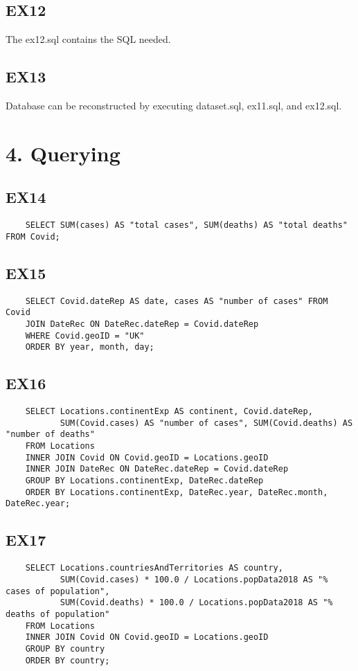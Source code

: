 \documentclass{report}
\begin{document}
\subsection*{EX12} 
The ex12.sql contains the SQL needed.
\subsection*{EX13} Database can be reconstructed by executing dataset.sql, ex11.sql, and ex12.sql.

\vspace{2mm}

\section*{4. Querying}
\subsection*{EX14}
\begin{verbatim}
    SELECT SUM(cases) AS "total cases", SUM(deaths) AS "total deaths" FROM Covid;
\end{verbatim}

\subsection*{EX15}
\begin{verbatim}
    SELECT Covid.dateRep AS date, cases AS "number of cases" FROM Covid
    JOIN DateRec ON DateRec.dateRep = Covid.dateRep
    WHERE Covid.geoID = "UK"
    ORDER BY year, month, day;
\end{verbatim}

\subsection*{EX16}
\begin {verbatim}
    SELECT Locations.continentExp AS continent, Covid.dateRep, 
           SUM(Covid.cases) AS "number of cases", SUM(Covid.deaths) AS "number of deaths"
    FROM Locations
    INNER JOIN Covid ON Covid.geoID = Locations.geoID
    INNER JOIN DateRec ON DateRec.dateRep = Covid.dateRep
    GROUP BY Locations.continentExp, DateRec.dateRep
    ORDER BY Locations.continentExp, DateRec.year, DateRec.month, DateRec.year;
\end{verbatim}

\subsection*{EX17}
\begin{verbatim}
    SELECT Locations.countriesAndTerritories AS country,
           SUM(Covid.cases) * 100.0 / Locations.popData2018 AS "% cases of population", 
           SUM(Covid.deaths) * 100.0 / Locations.popData2018 AS "% deaths of population"
    FROM Locations
    INNER JOIN Covid ON Covid.geoID = Locations.geoID
    GROUP BY country
    ORDER BY country;
\end{verbatim}
\end{document}
